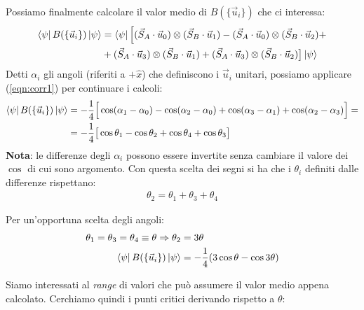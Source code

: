 \documentclass[../../FisicaTeorica.tex]{subfiles}
\begin{document}
Possiamo finalmente calcolare il valor medio di $B(\{\vec{u}_i\})$ che ci interessa:
\begin{align*}
\Bra{\psi}B(\{\vec{u}_i\})\Ket{\psi} &= \Bra{\psi} \Big[
(\vec{S}_A \cdot \vec{u}_0) \otimes (\vec{S}_B \cdot \vec{u}_1) - (\vec{S}_A \cdot \vec{u}_0 ) \otimes (\vec{S}_B \cdot \vec{u}_2) +\\
&+(\vec{S}_A \cdot \vec{u}_3) \otimes (\vec{S}_B \cdot \vec{u}_1) + (\vec{S}_A \cdot \vec{u}_3)\otimes (\vec{S}_B \cdot \vec{u}_2)\big] \Ket{\psi}
\end{align*}
Detti $\alpha_i$ gli angoli (riferiti a $+\hat{x}$) che definiscono i $\vec{u}_i$ unitari, possiamo applicare (\ref{eqn:corr1}) per continuare i calcoli:
\begin{align*}
\Bra{\psi}B(\{\vec{u}_i\})\Ket{\psi} &= -\frac{1}{4}\Big[\cos(\alpha_1-\alpha_0)-\cos(\alpha_2-\alpha_0) + \cos(\alpha_3-\alpha_1) + \cos(\alpha_2-\alpha_3)\Big]=\\
&= -\frac{1}{4}\big[\cos \theta_1 -\cos\theta_2 + \cos\theta_4 +\cos\theta_3\big]
\end{align*}
\textbf{Nota}: le differenze degli $\alpha_i$ possono essere invertite senza cambiare il valore dei $\cos$ di cui sono argomento. Con questa scelta dei segni si ha che i $\theta_i$ definiti dalle differenze rispettano:
\begin{align*}
\theta_2 = \theta_1 + \theta_3 + \theta_4
\end{align*}

Per un'opportuna scelta degli angoli: 
\begin{align*}
\theta_1 = \theta_3 = \theta_4  \equiv \theta \Rightarrow  \theta_2 &= 3\theta\\
 \Bra{\psi}B(\{\vec{u}_i\})\Ket{\psi}&=-\frac{1}{4}(3\cos\theta - \cos 3\theta)
\end{align*}

Siamo interessati al \textit{range} di valori che può assumere il valor medio appena calcolato. Cerchiamo quindi i punti critici derivando rispetto a $\theta$:
\end{document}
